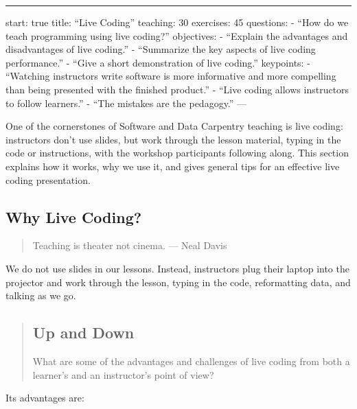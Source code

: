 \begin{center}
\rule{3in}{0.4pt}
\end{center}
start: true
title: ``Live Coding''
teaching: 30
exercises: 45
questions:
- ``How do we teach programming using live coding?''
objectives:
- ``Explain the advantages and disadvantages of live coding.''
- ``Summarize the key aspects of live coding performance.''
- ``Give a short demonstration of live coding.''
keypoints:
- ``Watching instructors write software is more informative and more compelling than being presented with the finished product.''
- ``Live coding allows instructors to follow learners.''
- ``The mistakes are the pedagogy.''
---

One of the cornerstones of Software and Data Carpentry teaching is live
coding: instructors don't use slides, but work through the lesson material,
typing in the code or instructions, with the workshop participants following
along. This section explains how it works, why we use it, and
gives general tips for an effective live coding presentation.

\subsection*{Why Live Coding?}

\begin{quote}   %
Teaching is theater not cinema.\newline
— Neal Davis
\end{quote}   %

We do not use slides in our lessons.
Instead, instructors plug their laptop into the projector
and work through the lesson,
typing in the code,
reformatting data,
and talking as we go.

\begin{quotation}   %
\subsection*{Up and Down}

What are some of the advantages and challenges of live coding
from both a learner's and an instructor's point of view?
\end{quotation}   %

Its advantages are:


